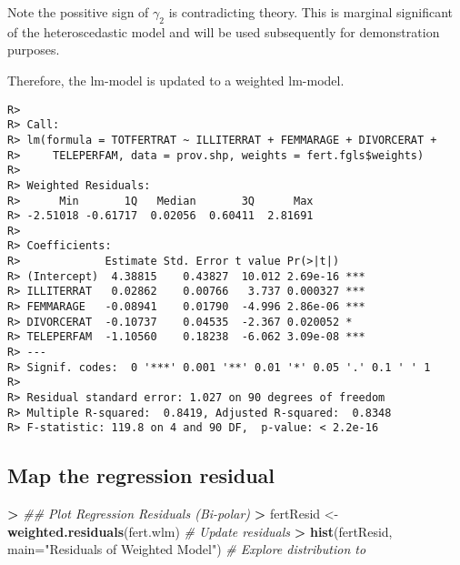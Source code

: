 \documentclass[
]{article}
\newenvironment{Shaded}{\begin{snugshade}}{\end{snugshade}}
\newcommand{\CommentTok}[1]{\textcolor[rgb]{0.56,0.35,0.01}{\textit{#1}}}
\newcommand{\DataTypeTok}[1]{\textcolor[rgb]{0.13,0.29,0.53}{#1}}
\newcommand{\ErrorTok}[1]{\textcolor[rgb]{0.64,0.00,0.00}{\textbf{#1}}}
\newcommand{\KeywordTok}[1]{\textcolor[rgb]{0.13,0.29,0.53}{\textbf{#1}}}
\newcommand{\NormalTok}[1]{#1}
\newcommand{\OperatorTok}[1]{\textcolor[rgb]{0.81,0.36,0.00}{\textbf{#1}}}
\newcommand{\StringTok}[1]{\textcolor[rgb]{0.31,0.60,0.02}{#1}}
\begin{document}
Note the possitive sign of \(\gamma_2\) is contradicting theory. This is
marginal significant of the heteroscedastic model and will be used
subsequently for demonstration purposes.

Therefore, the lm-model is updated to a weighted lm-model.

\begin{Shaded}
\end{Shaded}

\begin{verbatim}
R> 
R> Call:
R> lm(formula = TOTFERTRAT ~ ILLITERRAT + FEMMARAGE + DIVORCERAT + 
R>     TELEPERFAM, data = prov.shp, weights = fert.fgls$weights)
R> 
R> Weighted Residuals:
R>      Min       1Q   Median       3Q      Max 
R> -2.51018 -0.61717  0.02056  0.60411  2.81691 
R> 
R> Coefficients:
R>             Estimate Std. Error t value Pr(>|t|)    
R> (Intercept)  4.38815    0.43827  10.012 2.69e-16 ***
R> ILLITERRAT   0.02862    0.00766   3.737 0.000327 ***
R> FEMMARAGE   -0.08941    0.01790  -4.996 2.86e-06 ***
R> DIVORCERAT  -0.10737    0.04535  -2.367 0.020052 *  
R> TELEPERFAM  -1.10560    0.18238  -6.062 3.09e-08 ***
R> ---
R> Signif. codes:  0 '***' 0.001 '**' 0.01 '*' 0.05 '.' 0.1 ' ' 1
R> 
R> Residual standard error: 1.027 on 90 degrees of freedom
R> Multiple R-squared:  0.8419, Adjusted R-squared:  0.8348 
R> F-statistic: 119.8 on 4 and 90 DF,  p-value: < 2.2e-16
\end{verbatim}

\hypertarget{map-the-regression-residual}{%
\subsection{Map the regression
residual}\label{map-the-regression-residual}}

\begin{Shaded}
\begin{Highlighting}[]
\OperatorTok{>}\StringTok{ }\CommentTok{## Plot Regression Residuals (Bi-polar)}
\ErrorTok{>}\StringTok{ }\NormalTok{fertResid <-}\StringTok{ }\KeywordTok{weighted.residuals}\NormalTok{(fert.wlm)                }\CommentTok{# Update residuals}
\OperatorTok{>}\StringTok{ }\KeywordTok{hist}\NormalTok{(fertResid, }\DataTypeTok{main=}\StringTok{"Residuals of Weighted Model"}\NormalTok{)      }\CommentTok{# Explore distribution to}
\end{Highlighting}
\end{Shaded}
\end{document}
